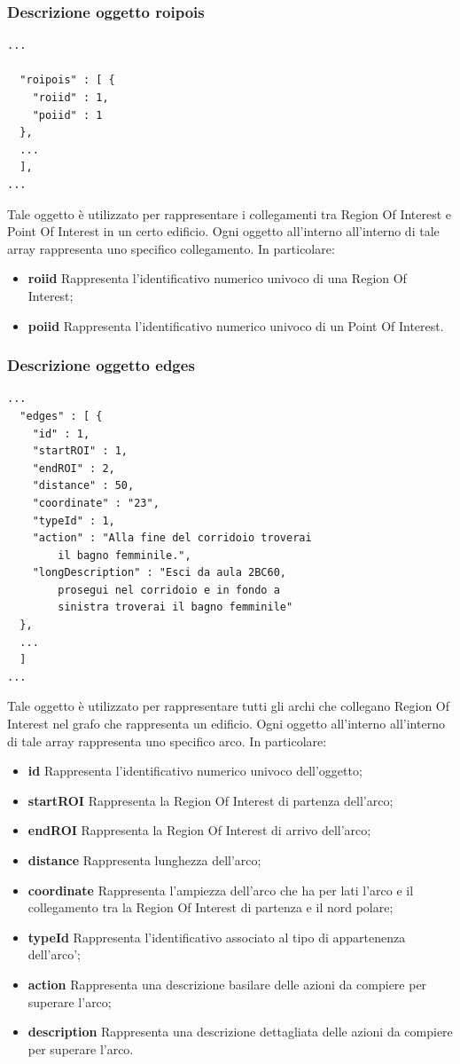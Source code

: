\documentclass[../ManualeSviluppatore.tex]{subfiles}
\begin{document}
	\subsubsection{Descrizione oggetto roipois}
		\begin{lstlisting}
...
  
  "roipois" : [ {
	"roiid" : 1,
	"poiid" : 1
  },  
  ...
  ],
...
		\end{lstlisting}
		Tale oggetto è utilizzato per rappresentare i collegamenti tra Region Of Interest e Point Of Interest in un certo edificio. Ogni oggetto all'interno all'interno di tale array rappresenta uno specifico collegamento. In particolare:
		\begin{itemize}
			\item \textbf{roiid} Rappresenta l'identificativo numerico univoco di una Region Of Interest;
			\item \textbf{poiid} Rappresenta l'identificativo numerico univoco di un Point Of Interest.
		\end{itemize}
		
	\subsubsection{Descrizione oggetto edges}
		\begin{lstlisting}
...
  "edges" : [ {
    "id" : 1,
    "startROI" : 1,
    "endROI" : 2,
    "distance" : 50,
    "coordinate" : "23",
    "typeId" : 1,
    "action" : "Alla fine del corridoio troverai 
    	il bagno femminile.",
    "longDescription" : "Esci da aula 2BC60, 
    	prosegui nel corridoio e in fondo a 
    	sinistra troverai il bagno femminile"
  },
  ...
  ]
...
		\end{lstlisting}
		Tale oggetto è utilizzato per rappresentare tutti gli archi che collegano Region Of Interest nel grafo che rappresenta un edificio. Ogni oggetto all'interno all'interno di tale array rappresenta uno specifico arco. In particolare:
		\begin{itemize}
			\item \textbf{id} Rappresenta l'identificativo numerico univoco dell'oggetto;
			\item \textbf{startROI} Rappresenta la Region Of Interest di partenza dell'arco;
			\item \textbf{endROI} Rappresenta la Region Of Interest di arrivo dell'arco;
			\item \textbf{distance} Rappresenta lunghezza dell'arco;
			\item \textbf{coordinate} Rappresenta l'ampiezza dell'arco che ha per lati l'arco e il collegamento tra la Region Of Interest di partenza e il nord polare;
			\item \textbf{typeId} Rappresenta l'identificativo associato al tipo di appartenenza dell'arco';
			\item \textbf{action} Rappresenta una descrizione basilare delle azioni da compiere per superare l'arco;
			\item \textbf{description} Rappresenta una descrizione dettagliata delle azioni da compiere per superare l'arco.
		\end{itemize}
		
\end{document}
